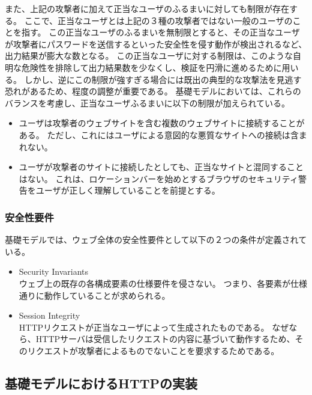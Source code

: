 \documentclass[12pt,a4paper]{jbook}
\begin{document}
また、上記の攻撃者に加えて正当なユーザのふるまいに対しても制限が存在する。
ここで、正当なユーザとは上記の３種の攻撃者ではない一般のユーザのことを指す。
この正当なユーザのふるまいを無制限とすると、その正当なユーザが攻撃者にパスワードを送信するといった安全性を侵す動作が検出されるなど、出力結果が膨大な数となる。
この正当なユーザに対する制限は、このような自明な危険性を排除して出力結果数を少なくし、検証を円滑に進めるために用いる。
しかし、逆にこの制限が強すぎる場合には既出の典型的な攻撃法を見逃す恐れがあるため、程度の調整が重要である。
基礎モデルにおいては、これらのバランスを考慮し、正当なユーザふるまいに以下の制限が加えられている。
\begin{itemize}
\item ユーザは攻撃者のウェブサイトを含む複数のウェブサイトに接続することがある。
ただし、これにはユーザによる意図的な悪質なサイトへの接続は含まれない。
\item ユーザが攻撃者のサイトに接続したとしても、正当なサイトと混同することはない。
これは、ロケーションバーを始めとするブラウザのセキュリティ警告をユーザが正しく理解していることを前提とする。
\end{itemize}

\subsubsection{安全性要件}
基礎モデルでは、ウェブ全体の安全性要件として以下の２つの条件が定義されている。
\begin{itemize}
\item Security Invariants\\
ウェブ上の既存の各構成要素の仕様要件を侵さない。
つまり、各要素が仕様通りに動作していることが求められる。
\item Session Integrity\\
HTTPリクエストが正当なユーザによって生成されたものである。
なぜなら、HTTPサーバは受信したリクエストの内容に基づいて動作するため、そのリクエストが攻撃者によるものでないことを要求するためである。
\end{itemize}

\subsection{基礎モデルにおけるHTTPの実装}
\label{sec:based-model-http}
\end{document}
